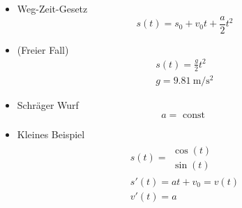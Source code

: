 \documentclass[a4paper, 12pt, onecolumn]{scrartcl}
\begin{document}
  \begin{itemize}
    \item Weg-Zeit-Gesetz \\
  \begin{equation}
    s (t) = s_0 + v_0 t + \frac{a}{2} t^2
  \end{equation}
  \item (Freier Fall) \\
  \begin{align}
    s (t) = \frac{g}{2} t^2 \\ g = \SI{9.81}{\meter\per\square\second}
  \end{align}
  \item Schräger Wurf \\
  \begin{equation}
    a = \text{ const } 
  \end{equation}
  \item Kleines Beispiel \\
  \begin{align}
    s (t) = \begin{matrix} \cos (t) \\ \sin (t) \end{matrix} \\
    s' (t) = a t + v_0 = v (t)\\
    v' (t) = a
  \end{align}


\end{itemize}
\end{document}
